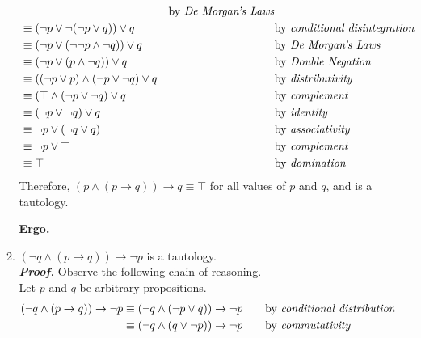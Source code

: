 \documentclass[11pt,a4paper]{article}
\begin{document}
\begin{enumerate}
\begin{enumerate}
\begin{align*}
            &\quad
            &\text{by \emph{De Morgan's Laws}} \\
        &\equiv (\neg p \lor \neg(\neg p \lor q)) \lor q 
            &\quad
            &\text{by \emph{conditional disintegration}} \\
        &\equiv (\neg p \lor (\neg \neg p \land \neg q)) \lor q
            &\quad
            &\text{by \emph{De Morgan's Laws}} \\
        &\equiv (\neg p \lor (p \land \neg q)) \lor q
            &\quad
            &\text{by \emph{Double Negation}} \\
        &\equiv ((\neg p \lor p) \land(\neg p \lor \neg q) \lor q
            &\quad
            &\text{by \emph{distributivity}} \\
        &\equiv (\top \land (\neg p \lor \neg q) \lor q
            &\quad
            &\text{by \emph{complement}} \\
        &\equiv (\neg p \lor \neg q) \lor q
            &\quad
            &\text{by \emph{identity}} \\
        &\equiv \neg p \lor (\neg q \lor q)
            &\quad
            &\text{by \emph{associativity}} \\
        &\equiv \neg p \lor \top
            &\quad
            &\text{by \emph{complement}} \\
        &\equiv \top
            &\quad
            &\text{by \emph{domination}}
    \end{align*}
    Therefore, $(p \land (p \rightarrow q)) \rightarrow q \equiv \top$ for all values of $p$ and $q$, and is a tautology.
        \begin{flushright}
            \textbf{Ergo.}
        \end{flushright}
        \pagebreak
        \item 
        $(\neg q \land (p \rightarrow q)) \rightarrow \neg p$ is a tautology. \\
        \emph{\textbf{Proof.}} Observe the following chain of reasoning. \\ 
        Let $p$ and $q$ be arbitrary propositions.
    \begin{align*}
    (\neg q \land (p \rightarrow q)) \rightarrow \neg p
        &\equiv (\neg q \land (\neg p \lor q)) \rightarrow \neg p 
            &\quad
            &\text{by \emph{conditional distribution}} \\
        &\equiv (\neg q \land (q \lor \neg p)) \rightarrow \neg p
            &\quad
            &\text{by \emph{commutativity}} \\

\end{align*}
\end{enumerate}
\end{enumerate}
\end{document}
